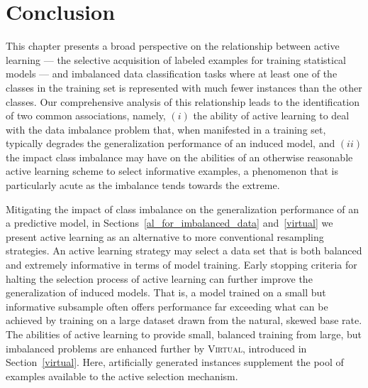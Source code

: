 \section{Conclusion}
\label{sec:conclusion}

This chapter presents a broad perspective on the relationship between active learning --- the selective acquisition of labeled examples for training statistical models --- and imbalanced data classification tasks where at least one of the classes in the training set is represented with much fewer instances than the other classes. Our comprehensive analysis of this relationship leads to the identification of two common associations, namely, $(i)$ the ability of active learning to deal with the data imbalance problem that, when manifested in a training set, typically degrades the generalization performance of an induced model, and $(ii)$ the impact class imbalance may have on the abilities of an otherwise reasonable active learning scheme to select informative examples, a phenomenon that is particularly acute as the imbalance tends towards the extreme.

Mitigating the impact of class imbalance on the generalization performance of an a predictive model, in Sections~\ref{al_for_imbalanced_data} and~\ref{virtual} we present active learning as an alternative to more conventional resampling strategies. An active learning strategy may select a data set that is both balanced and extremely informative in terms of model training. Early stopping criteria for halting the selection process of active learning can further improve the generalization of induced models. That is, a model trained on a small but informative subsample often offers performance far exceeding what can be achieved by training on a large dataset drawn from the natural, skewed base rate. The abilities of active learning to provide small, balanced training from large, but imbalanced problems are enhanced further by \textsc{Virtual}, introduced in Section~\ref{virtual}. Here, artificially generated instances supplement the pool of examples available to the active selection mechanism.

